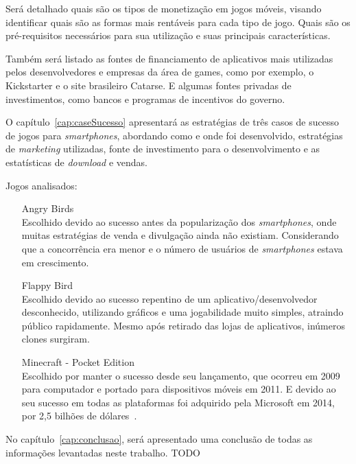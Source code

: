 Será detalhado quais são os tipos de monetização em jogos móveis, visando identificar quais são as formas mais rentáveis para cada tipo de jogo. Quais são os pré-requisitos necessários para sua utilização e suas principais características.


Também será listado as fontes de financiamento de aplicativos mais utilizadas pelos desenvolvedores e empresas da área de games, como por exemplo, o Kickstarter\cite{kickstarter} e o site brasileiro Catarse\cite{catarse}. E algumas fontes privadas de investimentos, como bancos e programas de incentivos do governo.






O capítulo~\ref{cap:caseSucesso} apresentará as estratégias de três casos de sucesso de jogos para \emph{smartphones}, abordando como e onde foi desenvolvido, estratégias de \emph{marketing} utilizadas, fonte de investimento para o desenvolvimento e as estatísticas de \emph{download} e vendas.\newline

Jogos analisados:

\begin{itemize}

	\item [Angry Birds~\cite{angrybirds}] \hfill \\
		Escolhido devido ao sucesso antes da popularização dos \emph{smartphones}, onde muitas estratégias de venda e divulgação ainda não existiam. Considerando que a concorrência era menor e o número de usuários de \emph{smartphones} estava em crescimento.

	\item [Flappy Bird~\cite{flappybird}] \hfill \\
		Escolhido devido ao sucesso repentino de um aplicativo/desenvolvedor desconhecido, utilizando gráficos e uma jogabilidade muito simples, atraindo público rapidamente. Mesmo após retirado das lojas de aplicativos, inúmeros clones surgiram.

	\item [Minecraft - Pocket Edition~\cite{minecraft}] \hfill \\
		Escolhido por manter o sucesso desde seu lançamento, que ocorreu em 2009 para computador e portado para dispositivos móveis em 2011. E devido ao seu sucesso em todas as plataformas foi adquirido pela Microsoft em 2014, por 2,5 bilhões de dólares~\cite{minecraft-bought}.
	
	

\end{itemize}





No capítulo~\ref{cap:conclusao}, será apresentado uma conclusão de todas as informações levantadas neste trabalho. TODO






